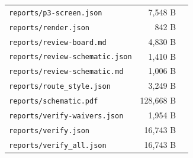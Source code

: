 \documentclass[11pt]{article}
\begin{document}
{\begin{longtable}{p{9cm}rp{4cm}}
\texttt{reports/p3-screen.json} & 7,548 B &  \\
\texttt{reports/render.json} & 842 B &  \\
\texttt{reports/review-board.md} & 4,830 B &  \\
\texttt{reports/review-schematic.json} & 1,410 B &  \\
\texttt{reports/review-schematic.md} & 1,006 B &  \\
\texttt{reports/route\_style.json} & 3,249 B &  \\
\texttt{reports/schematic.pdf} & 128,668 B &  \\
\texttt{reports/verify-waivers.json} & 1,954 B &  \\
\texttt{reports/verify.json} & 16,743 B &  \\
\texttt{reports/verify\_all.json} & 16,743 B &  \\
\hline
\end{longtable}
}
\end{document}
